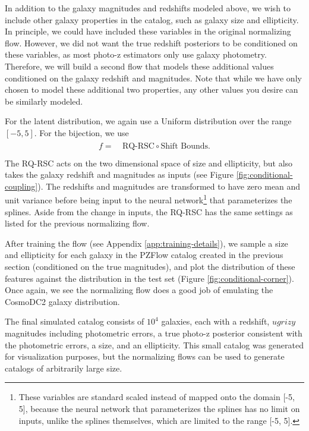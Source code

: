 \documentclass[twocolumn,twocolappendix,linenumbers]{aastex631}
\begin{document}
In addition to the galaxy magnitudes and redshifts modeled above, we wish to include other galaxy properties in the catalog, such as galaxy size and ellipticity.
In principle, we could have included these variables in the original normalizing flow.
However, we did not want the true redshift posteriors to be conditioned on these variables, as most photo-z estimators only use galaxy photometry.
Therefore, we will build a second flow that models these additional values conditioned on the galaxy redshift and magnitudes.
Note that while we have only chosen to model these additional two properties, any other values you desire can be similarly modeled.

For the latent distribution, we again use a Uniform distribution over the range $[-5, 5]$.
For the bijection, we use
\begin{align}
    \begin{split}
        f =& ~ \text{RQ-RSC} \circ \text{Shift Bounds}. \\
    \end{split}
\end{align}
The RQ-RSC acts on the two dimensional space of size and ellipticity, but also takes the galaxy redshift and magnitudes as inputs (see Figure \ref{fig:conditional-coupling}).
The redshifts and magnitudes are transformed to have zero mean and unit variance before being input to the neural network\footnote{These variables are standard scaled instead of mapped onto the domain [-5, 5], because the neural network that parameterizes the splines has no limit on inputs, unlike the splines themselves, which are limited to the range [-5, 5].} that parameterizes the splines.
Aside from the change in inputs, the RQ-RSC has the same settings as listed for the previous normalizing flow.

After training the flow (see Appendix \ref{app:training-details}), we sample a size and ellipticity for each galaxy in the PZFlow catalog created in the previous section (conditioned on the true magnitudes), and plot the distribution of these features against the distribution in the test set (Figure \ref{fig:conditional-corner}).
Once again, we see the normalizing flow does a good job of emulating the CosmoDC2 galaxy distribution.

The final simulated catalog consists of $10^4$ galaxies, each with a redshift, $ugrizy$ magnitudes including photometric errors, a true photo-z posterior consistent with the photometric errors, a size, and an ellipticity.
This small catalog was generated for visualization purposes, but the normalizing flows can be used to generate catalogs of arbitrarily large size.
\end{document}
